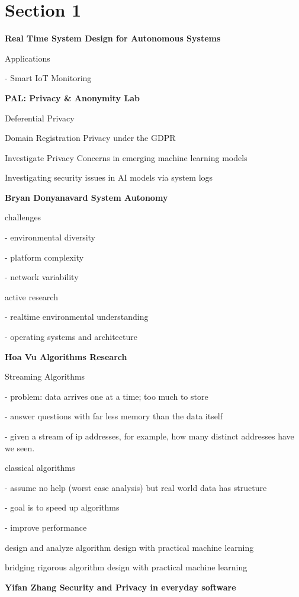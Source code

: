 \documentclass{article}
\begin{document}
\section{Section 1}


\textbf{\Large Real Time System Design for Autonomous Systems}


Applications

- Smart IoT Monitoring


\textbf{PAL: Privacy \& Anonymity Lab}

Deferential Privacy

Domain Registration Privacy under the GDPR

Investigate Privacy Concerns in emerging machine learning models

Investigating security issues in AI models via system logs

\textbf{\Large Bryan Donyanavard System Autonomy}

challenges

- environmental diversity

- platform complexity

- network variability

active research

- realtime environmental understanding

- operating systems and architecture

\textbf{\Large Hoa Vu Algorithms Research}


Streaming Algorithms

- problem: data arrives one at a time; too much to store

- answer questions with far less memory than the data itself

- given a stream of ip addresses, for example, how many distinct addresses have we seen.

classical algorithms

- assume no help (worst case analysis) but real world data has structure

- goal is to speed up algorithms

- improve performance

design and analyze algorithm design with practical machine learning

bridging rigorous algorithm design with practical machine learning


\textbf{\Large Yifan Zhang Security and Privacy in everyday software}
\end{document}
